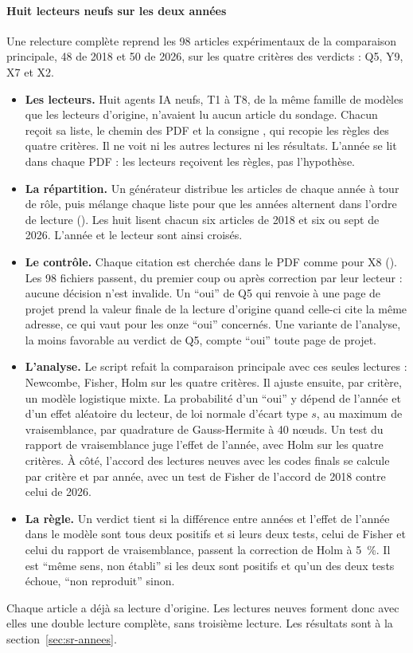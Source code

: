 \paragraph{Huit lecteurs neufs sur les deux années}
Une relecture complète reprend les 98 articles expérimentaux de la comparaison principale, 48 de 2018
et 50 de 2026, sur les quatre critères des verdicts : Q5, Y9, X7 et X2.
\begin{itemize}
  \item \textbf{Les lecteurs.} Huit agents IA neufs, T1 à T8, de la même famille de modèles que les
  lecteurs d'origine, n'avaient lu aucun article du sondage. Chacun reçoit sa liste, le chemin des PDF et la consigne
  , qui recopie les règles des quatre critères. Il
  ne voit ni les autres lectures ni les résultats. L'année se lit dans chaque PDF : les lecteurs
  reçoivent les règles, pas l'hypothèse.
  \item \textbf{La répartition.} Un générateur  distribue les articles de
  chaque année à tour de rôle, puis mélange chaque liste pour que les années alternent dans l'ordre de
  lecture (). Les huit lisent chacun six articles de 2018 et six ou sept
  de 2026. L'année et le lecteur sont ainsi croisés.
  \item \textbf{Le contrôle.} Chaque citation est cherchée dans le PDF comme pour X8
  (). Les 98 fichiers passent, du premier coup ou après correction par leur
  lecteur : aucune décision n'est invalide. Un \enquote{oui} de Q5 qui renvoie à une page de projet
  prend la valeur finale de la lecture d'origine quand celle-ci cite la même adresse, ce qui vaut pour les onze \enquote{oui} concernés. Une variante de l'analyse, la moins favorable au
  verdict de Q5, compte \enquote{oui} toute page de projet.
  \item \textbf{L'analyse.} Le script  refait la comparaison principale avec
  ces seules lectures : Newcombe, Fisher, Holm sur les quatre critères. Il ajuste ensuite, par
  critère, un modèle logistique mixte. La probabilité d'un \enquote{oui} y dépend de l'année et d'un
  effet aléatoire du lecteur, de loi normale d'écart type $s$, au maximum de vraisemblance, par
  quadrature de Gauss-Hermite à 40 nœuds. Un test du rapport de vraisemblance juge l'effet de
  l'année, avec Holm sur les quatre critères. À côté, l'accord des lectures neuves avec les codes
  finals se calcule par critère et par année, avec un test de Fisher de l'accord de 2018 contre celui
  de 2026.
  \item \textbf{La règle.} Un verdict tient si la différence entre années et l'effet de
  l'année dans le modèle sont tous deux positifs et si leurs deux tests, celui de Fisher et celui du
  rapport de vraisemblance, passent la correction de Holm à 5~\%. Il est \enquote{même sens,
  non établi} si les deux sont positifs et qu'un des deux tests échoue, \enquote{non reproduit}
  sinon.
\end{itemize}
Chaque article a déjà sa lecture d'origine. Les lectures neuves forment donc avec elles une double
lecture complète, sans troisième lecture. Les résultats sont à la section~\ref{sec:sr-annees}.

